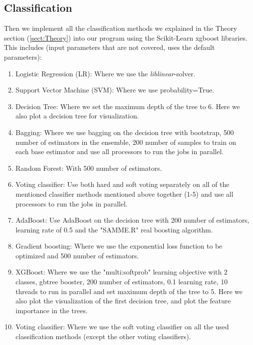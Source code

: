 \documentclass[12pt,a4paper,english]{article}
\begin{document}
\subsection{Classification}
\label{subsect:classif}
Then we implement all the classification methods we explained in the Theory section (\ref{sect:Theory}) into our program using the Scikit-Learn xgboost libraries. This includes (input parameters that are not covered, uses the default parameters):
\begin{enumerate}
	\item Logistic Regression (LR): Where we use the \textit{liblinear}-solver.
	\item Support Vector Machine (SVM): Where we use probability=True.
	\item Decision Tree: Where we set the maximum depth of the tree to 6. Here we also plot a decision tree for visualization.
	\item Bagging: Where we use bagging on the decision tree with bootstrap, 500 number of estimators in the ensemble, 200 number of samples to train on each base estimator and use all processors to run the jobs in parallel.
	\item Random Forest: With 500 number of estimators.
	\item Voting classifier: Use both hard and soft voting separately on all of the mentioned classifier methods mentioned above together (1-5) and use all processors to run the jobs in parallel.
	\item AdaBoost: Use AdaBoost on the decision tree with 200 number of estimators, learning rate of 0.5 and the "SAMME.R" real boosting algorithm.
	\item Gradient boosting: Where we use the exponential loss function to be optimized and 500 number of estimators.
	\item XGBoost: Where we use the "multi:softprob" learning objective with 2 classes, gbtree booster, 200 number of estimators, 0.1 learning rate, 10 threads to run in parallel and set maximum depth of the tree to 5. Here we also plot the visualization of the first decision tree, and plot the feature importance in the trees.
	\item Voting classifier: Where we use the soft voting classifier on all the used classification methods (except the other voting classifiers).
\end{enumerate}
\end{document}
